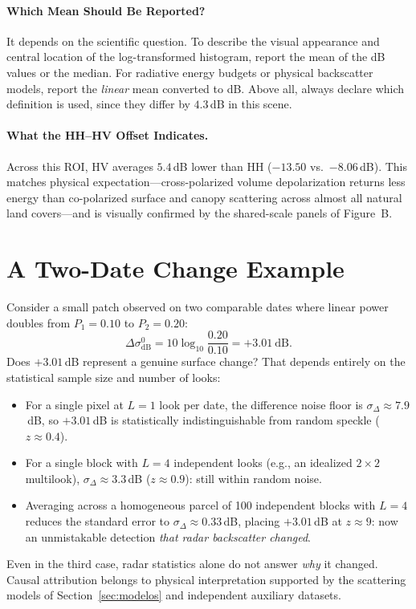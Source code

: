 \documentclass[11pt,a4paper]{article}
\begin{document}
\paragraph{Which Mean Should Be Reported?} It depends on the scientific question. To describe the visual appearance and central location of the log-transformed histogram, report the mean of the dB values or the median. For radiative energy budgets or physical backscatter models, report the \emph{linear} mean converted to dB. Above all, always declare which definition is used, since they differ by $4.3$\,dB in this scene.

\paragraph{What the HH--HV Offset Indicates.} Across this ROI, HV averages $5.4$\,dB lower than HH ($-13.50$ vs.\ $-8.06$\,dB). This matches physical expectation---cross-polarized volume depolarization returns less energy than co-polarized surface and canopy scattering across almost all natural land covers---and is visually confirmed by the shared-scale panels of Figure~B.

\section{A Two-Date Change Example}
\label{sec:ej-dos-fechas}

Consider a small patch observed on two comparable dates where linear power doubles from $P_1=0.10$ to $P_2=0.20$:
\begin{equation}
  \Delta\sigma^0_{\mathrm{dB}}=10\log_{10}\frac{0.20}{0.10}=+3.01\ \text{dB}.
\end{equation}
Does $+3.01$\,dB represent a genuine surface change? That depends entirely on the statistical sample size and number of looks:
\begin{itemize}
  \item For a single pixel at $L=1$ look per date, the difference noise floor is $\sigma_\Delta\approx7.9$\,dB, so $+3.01$\,dB is statistically indistinguishable from random speckle ($z\approx0.4$).
  \item For a single block with $L=4$ independent looks (e.g., an idealized $2\times2$ multilook), $\sigma_\Delta\approx3.3$\,dB ($z\approx0.9$): still within random noise.
  \item Averaging across a homogeneous parcel of 100 independent blocks with $L=4$ reduces the standard error to $\sigma_\Delta\approx0.33$\,dB, placing $+3.01$\,dB at $z\approx9$: now an unmistakable detection \emph{that radar backscatter changed}.
\end{itemize}
Even in the third case, radar statistics alone do not answer \emph{why} it changed. Causal attribution belongs to physical interpretation supported by the scattering models of Section~\ref{sec:modelos} and independent auxiliary datasets.
\end{document}
